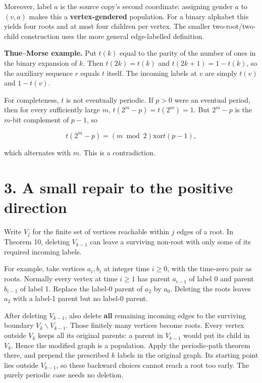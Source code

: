 \documentclass[
  11pt,
]{article}
\begin{document}
Moreover, label \(a\) is the source copy's second coordinate: assigning
gender \(a\) to \((v,a)\) makes this a \textbf{vertex-gendered}
population. For a binary alphabet this yields four roots and at most
four children per vertex. The smaller two-root/two-child construction
uses the more general edge-labelled definition.

\textbf{Thue--Morse example.} Put \(t(k)\) equal to the parity of the
number of ones in the binary expansion of \(k\). Then \(t(2k)=t(k)\) and
\(t(2k+1)=1-t(k)\), so the auxiliary sequence \(r\) equals \(t\) itself.
The incoming labels at \(v\) are simply \(t(v)\) and \(1-t(v)\).

For completeness, \(t\) is not eventually periodic. If \(p>0\) were an
eventual period, then for every sufficiently large \(m\),
\(t(2^m-p)=t(2^m)=1\). But \(2^m-p\) is the \(m\)-bit complement of
\(p-1\), so

\[t(2^m-p)=(m\bmod2)\mathbin{\mathrm{xor}}t(p-1),\]

which alternates with \(m\). This is a contradiction.

\section{3. A small repair to the positive
direction}\label{a-small-repair-to-the-positive-direction}

Write \(V_j\) for the finite set of vertices reachable within \(j\)
edges of a root. In Theorem 10, deleting \(V_{k-1}\) can leave a
surviving non-root with only some of its required incoming labels.

For example, take vertices \(a_i,b_i\) at integer time \(i\ge0\), with
the time-zero pair as roots. Normally every vertex at time \(i\ge1\) has
parent \(a_{i-1}\) of label 0 and parent \(b_{i-1}\) of label 1. Replace
the label-0 parent of \(a_2\) by \(a_0\). Deleting the roots leaves
\(a_2\) with a label-1 parent but no label-0 parent.

After deleting \(V_{k-1}\), also delete \textbf{all} remaining incoming
edges to the surviving boundary \(V_k\backslash V_{k-1}\). Those
finitely many vertices become roots. Every vertex outside \(V_k\) keeps
all its original parents: a parent in \(V_{k-1}\) would put its child in
\(V_k\). Hence the modified graph is a population. Apply the
periodic-path theorem there, and prepend the prescribed \(k\) labels in
the original graph. Its starting point lies outside \(V_{k-1}\), so
these backward choices cannot reach a root too early. The purely
periodic case needs no deletion.
\end{document}
